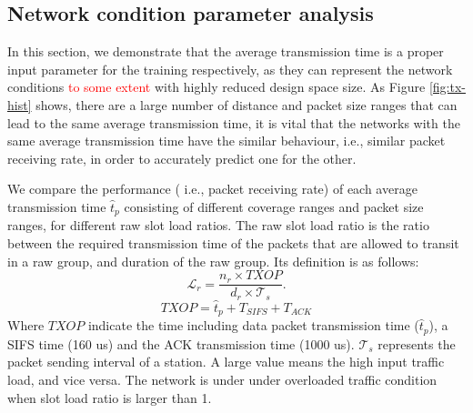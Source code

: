 
\subsection{Network condition parameter analysis \label{subsubsec:txselection}}

In this section, we demonstrate that the average transmission time 
is a proper input parameter for the training respectively, as they can represent the network conditions \textcolor{red}{to some extent} with  highly reduced design space size. As Figure \ref{fig:tx-hist} shows, there are a large number of distance and packet size ranges that can lead to the same average transmission time, it is vital that the networks with the same average transmission time have the similar behaviour, i.e., similar packet receiving rate, in order to accurately predict one for the other.

We compare the performance ( i.e., packet receiving rate) of each average transmission time $\hat{t}_p$ consisting of different coverage ranges and packet size ranges, for different \gls{raw} slot load ratios. The \gls{raw} slot load ratio is the ratio between the required transmission time of the 
packets that are allowed to transit in a \gls{raw} group, and duration of the \gls{raw} group. Its definition is as follows:
 \\
\begin{equation}
\mathcal{L}_{r} = \frac {n_r \times TXOP} {d_r \times \mathcal{T}_s}. 
\end{equation}
\begin{equation}
TXOP = \hat{t}_p + T_{SIFS} +  T_{ACK}
\end{equation}
Where $TXOP$ indicate the time including data packet transmission time ($\hat{t}_p$), a SIFS time (160 us) and the ACK transmission time (1000 us). $\mathcal{T}_s$ represents the packet sending interval of a station.
A large value means the high input traffic load, and vice versa. The network is under  under overloaded traffic condition when slot load ratio is larger than 1.




